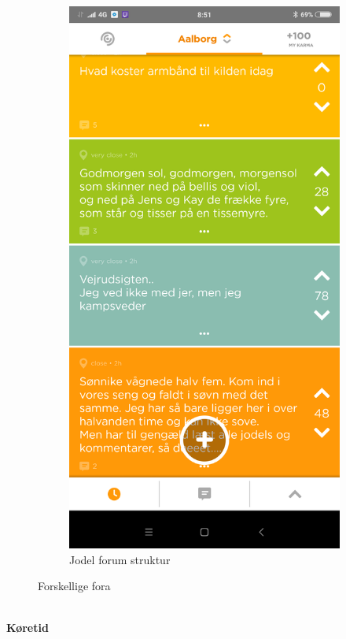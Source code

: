 \begin{figure}[H]
\begin{subfigure}{0.5\textwidth}
        \includegraphics[width=0.8\linewidth]{Projectdoc/Assets/Illustrationer/jodel_forum_eksempel.png}
        \caption{Jodel forum struktur}
        \label{fig:jodel_forum}
    \end{subfigure}
    \caption{Forskellige fora}
    \label{fig:forskellige_fora}
\end{figure}




\\
\textbf{Køretid}\\

